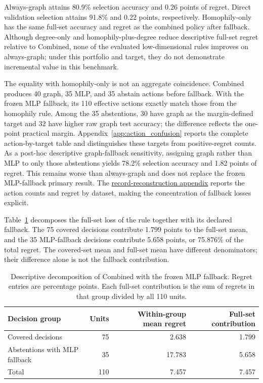 Always-graph attains 80.9\% selection accuracy and 0.26 points of regret. Direct validation selection attains 91.8\% and 0.22 points, respectively. Homophily-only has the same full-set accuracy and regret as the combined policy after fallback. Although degree-only and homophily-plus-degree reduce descriptive full-set regret relative to Combined, none of the evaluated low-dimensional rules improves on always-graph; under this portfolio and target, they do not demonstrate incremental value in this benchmark.

The equality with homophily-only is not an aggregate coincidence. Combined produces 40 graph, 35 MLP, and 35 abstain actions before fallback. With the frozen MLP fallback, its 110 effective actions exactly match those from the homophily rule. Among the 35 abstentions, 30 have graph as the margin-defined target and 32 have higher raw graph test accuracy; the difference reflects the one-point practical margin. Appendix~\ref{app:action_confusion} reports the complete action-by-target table and distinguishes these targets from positive-regret counts. As a post-hoc descriptive graph-fallback sensitivity, assigning graph rather than MLP to only those abstentions yields 78.2\% selection accuracy and 1.82 points of regret. This remains worse than always-graph and does not replace the frozen MLP-fallback primary result. The \hyperref[app:reproducibility]{record-reconstruction appendix} reports the action counts and regret by dataset, making the concentration of fallback losses explicit.

Table~\ref{tab:fallback_decomposition} decomposes the full-set loss of the rule together with its declared fallback. The 75 covered decisions contribute 1.799 points to the full-set mean, and the 35 MLP-fallback decisions contribute 5.658 points, or 75.876\% of the total regret. The covered-set mean and full-set mean have different denominators; their difference alone is not the fallback contribution.

\begin{table}[t]
\centering
\caption{Descriptive decomposition of Combined with the frozen MLP fallback. Regret entries are percentage points. Each full-set contribution is the sum of regrets in that group divided by all 110 units.}
\label{tab:fallback_decomposition}
\small
\begin{tabular}{@{}lrrr@{}}
\toprule
Decision group & Units & Within-group mean regret & Full-set contribution \\
\midrule
Covered decisions & 75 & 2.638 & 1.799 \\
Abstentions with MLP fallback & 35 & 17.783 & 5.658 \\
\midrule
Total & 110 & 7.457 & 7.457 \\
\bottomrule
\end{tabular}
\end{table}

